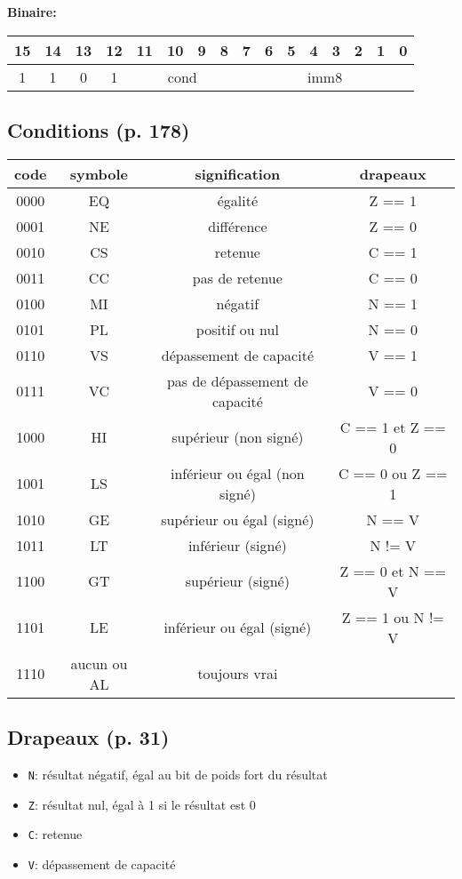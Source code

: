 \textbf{Binaire:}\\

\begin{tabular}{| c c c c c c c c c c c c c c c c |}
\hline
15 & 14 & 13 & 12 & \multicolumn{1}{|c}{11} & 10 & 9 & 8 & \multicolumn{1}{|c}{7} & 6 & 5 & 4 & 3 & 2 & 1 & 0 \\
\hline
1 & 1 & 0 & 1 & \multicolumn{4}{|c}{cond} & \multicolumn{8}{|c|}{imm8} \\
\hline
\end{tabular}








\subsection{Conditions (p. 178)}
\label{subsec:CondFlags}

\begin{tabular}{| c | c | c | c |}
\hline
\textbf{code} & \textbf{symbole} & \textbf{signification} & \textbf{drapeaux}\\
\hline
0000 & EQ & égalité & Z == 1\\
\hline
0001 & NE & différence & Z == 0\\
\hline
0010 & CS & retenue & C == 1\\
\hline
0011 & CC & pas de retenue & C == 0\\
\hline
0100 & MI & négatif & N == 1\\
\hline
0101 & PL & positif ou nul & N == 0\\
\hline
0110 & VS & dépassement de capacité & V == 1\\
\hline
0111 & VC & pas de dépassement de capacité & V == 0\\
\hline
1000 & HI & supérieur (non signé) & C == 1 et Z == 0\\
\hline
1001 & LS & inférieur ou égal (non signé) & C == 0 ou Z == 1\\
\hline
1010 & GE & supérieur ou égal (signé) & N == V\\
\hline
1011 & LT & inférieur (signé) & N != V\\
\hline
1100 & GT & supérieur (signé) & Z == 0 et N == V\\
\hline
1101 & LE & inférieur ou égal (signé) & Z == 1 ou N != V\\
\hline
1110 & aucun ou AL & toujours vrai & \\
\hline
\end{tabular}


\subsection{Drapeaux (p. 31)}
\label{subsec:Flags}

\begin{itemize}
	\item \texttt{N}: résultat négatif, égal au bit de poids fort du résultat
	\item \texttt{Z}: résultat nul, égal à 1 si le résultat est 0
	\item \texttt{C}: retenue
	\item \texttt{V}: dépassement de capacité
\end{itemize}


